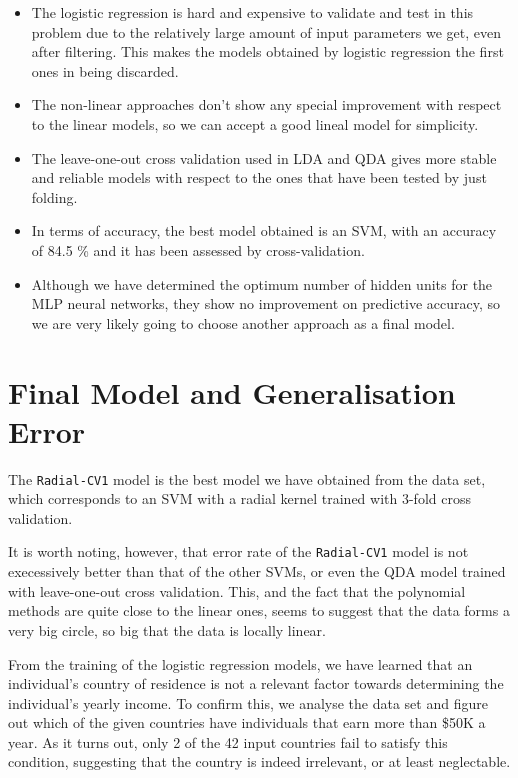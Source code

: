 \documentclass[english]{scrartcl}
\begin{document}
\begin{itemize}
\item The logistic regression is hard and expensive to validate and test in this 
problem due to the relatively large amount of input parameters we get, even after
filtering. This makes the models obtained by logistic regression the first ones 
in being discarded.

\item The non-linear approaches don't show any special improvement with respect
to the linear models, so we can accept a good lineal model for simplicity.

\item The leave-one-out cross validation used in LDA and QDA gives more stable
and reliable models with respect to the ones that have been tested by just folding.

\item In terms of accuracy, the best model obtained is an SVM, with an accuracy
of 84.5 \% and it has been assessed by cross-validation.

\item Although we have determined the optimum number of hidden units for the 
MLP neural networks, they show no improvement on predictive accuracy, so we
are very likely going to choose another approach as a final model.
\end{itemize}

\section{Final Model and Generalisation Error}

The \texttt{Radial-CV1} model is the best model we have obtained from the data set, which corresponds to an SVM with a radial kernel trained with 3-fold cross validation. 

It is worth noting, however, that error rate of the \texttt{Radial-CV1} model is not execessively better than that of the other SVMs, or even the QDA model trained with leave-one-out cross validation. This, and the fact that the polynomial methods are quite close to the linear ones, seems to suggest that the data forms a very big circle, so big that the data is locally linear.

From the training of the logistic regression models, we have learned that an individual's country of residence is not a relevant factor towards determining the individual's yearly income. To confirm this, we analyse the data set and figure out which of the given countries have individuals that earn more than \$50K a year. As it turns out, only 2 of the 42 input countries fail to satisfy this condition, suggesting that the country is indeed irrelevant, or at least neglectable.
\end{document}
